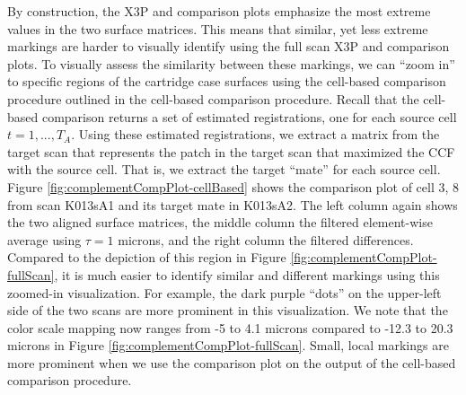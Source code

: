 \documentclass[11pt,]{isuthesis}
\begin{document}
By construction, the X3P and comparison plots emphasize the most extreme values in the two surface matrices.
This means that similar, yet less extreme markings are harder to visually identify using the full scan X3P and comparison plots.
To visually assess the similarity between these markings, we can ``zoom in'' to specific regions of the cartridge case surfaces using the cell-based comparison procedure outlined in the cell-based comparison procedure.
Recall that the cell-based comparison returns a set of estimated registrations, one for each source cell \(t = 1,...,T_A\).
Using these estimated registrations, we extract a matrix from the target scan that represents the patch in the target scan that maximized the CCF with the source cell.
That is, we extract the target ``mate'' for each source cell.
Figure \ref{fig:complementCompPlot-cellBased} shows the comparison plot of cell 3, 8 from scan K013sA1 and its target mate in K013sA2.
The left column again shows the two aligned surface matrices, the middle column the filtered element-wise average using \(\tau = 1\) microns, and the right column the filtered differences.
Compared to the depiction of this region in Figure \ref{fig:complementCompPlot-fullScan}, it is much easier to identify similar and different markings using this zoomed-in visualization.
For example, the dark purple ``dots'' on the upper-left side of the two scans are more prominent in this visualization.
We note that the color scale mapping now ranges from -5 to 4.1 microns compared to -12.3 to 20.3 microns in Figure \ref{fig:complementCompPlot-fullScan}.
Small, local markings are more prominent when we use the comparison plot on the output of the cell-based comparison procedure.
\end{document}
